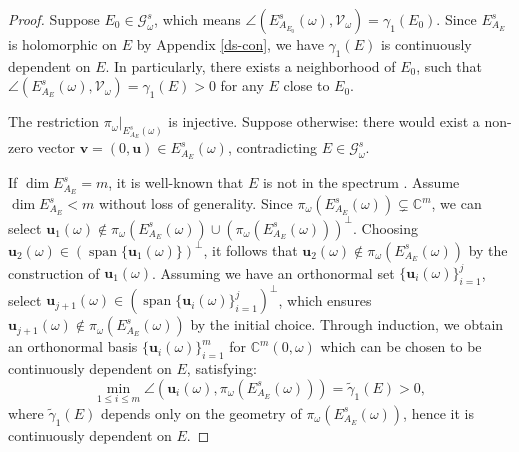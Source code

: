 \documentclass[11pt]{amsart}
\theoremstyle{remark}
\theoremstyle{definition}
\begin{document}
\begin{proof} 
Suppose $E_0\in\mathcal{G}^s_\omega$, which means $\angle (E^s_{A_{E_0}}(\omega) , \mathcal{V}_\omega)=\gamma_1(E_0).$
Since $E^s_{A_E}$ is holomorphic on $E$ by Appendix \ref{ds-con}, we have $\gamma_1(E)$ is continuously dependent on $E$. In particularly, there exists a neighborhood of $E_0$, such that $\angle (E^s_{A_{E}}(\omega) , \mathcal{V}_\omega)=\gamma_1(E)>0$ for any $E$ close to $E_0.$


The restriction $ \pi_\omega|_{E^s_{A_E}(\omega)} $ is injective. Suppose otherwise: there would exist a non-zero vector $ \mathbf{v} = (0, \mathbf{u}) \in E^s_{A_E}(\omega) $, contradicting $ E \in \mathcal{G}^s_\omega $.

If $ \dim E^s_{A_E} = m $, it is well-known that $ E $ is not in the spectrum \cite{Puig}. Assume $ \dim E^s_{A_E} < m $ without loss of generality. Since $ \pi_{\omega}(E^{s}_{A_E}(\omega)) \subsetneq \mathbb{C}^{m} $, we can select $ \mathbf{u}_1(\omega) \notin \pi_{\omega}(E^{s}_{A_E}(\omega)) \cup (\pi_{\omega}(E^{s}_{A_E}(\omega)))^{\perp} $. Choosing $ \mathbf{u}_2(\omega) \in \left(\operatorname{span}\{\mathbf{u}_1(\omega)\}\right)^{\perp} $, it follows that $ \mathbf{u}_2(\omega) \notin \pi_{\omega}(E^{s}_{A_E}(\omega)) $ by the construction of $ \mathbf{u}_1(\omega) $. Assuming we have an orthonormal set $ \{\mathbf{u}_i(\omega)\}_{i=1}^{j} $, select $ \mathbf{u}_{j+1}(\omega) \in \left(\operatorname{span}\{\mathbf{u}_i(\omega)\}_{i=1}^{j}\right)^{\perp} $, which ensures $ \mathbf{u}_{j+1}(\omega) \notin \pi_{\omega}(E^{s}_{A_E}(\omega)) $ by the initial choice. Through induction, we obtain an orthonormal basis $ \{\mathbf{u}_i(\omega)\}_{i=1}^{m} $ for $ \mathbb{C}^{m}(0, \omega) $ which can be chosen to be continuously dependent on $E$, satisfying: \begin{equation}\label{angle-11}
\min_{1 \leq i \leq m} \angle\left(\mathbf{u}_i(\omega), \pi_{\omega}(E^{s}_{A_E}(\omega))\right)= \tilde{\gamma}_1(E) > 0,
\end{equation} where $ \tilde{\gamma}_1(E) $ depends only on the geometry of $ \pi_\omega(E^s_{A_{E}}(\omega)) $, hence it is continuously dependent on $E$.


\end{proof}
\end{document}
